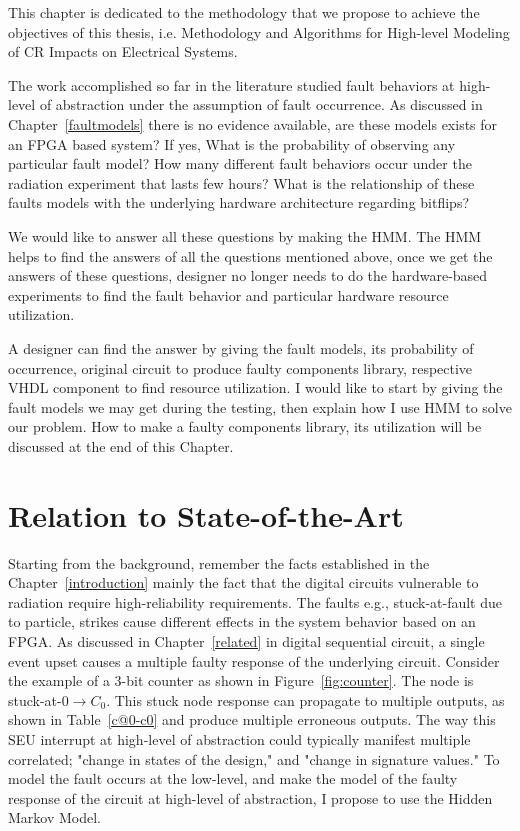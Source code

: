 This chapter is dedicated to the methodology that we propose to achieve the objectives of this thesis, i.e. Methodology and Algorithms for High-level Modeling of CR Impacts on Electrical Systems.




The work accomplished so far in the literature studied fault behaviors at high-level of abstraction under the assumption of fault occurrence. As discussed in Chapter~\ref{faultmodels} there is no evidence available, are these models exists for an FPGA based system? If yes, What is the probability of observing any particular fault model? How many different fault behaviors occur under the radiation experiment that lasts few hours?  What is the relationship of these faults models with the underlying hardware architecture regarding bitflips?

We would like to answer all these questions by making the HMM. The HMM helps to find the answers of all the questions mentioned above, once we get the answers of these questions, designer no longer needs to do the hardware-based experiments to find the fault behavior and particular hardware resource utilization. 

A designer can find the answer by giving the fault models, its probability of occurrence, original circuit to produce faulty components library, respective VHDL component to find resource utilization. I would like to start by giving the fault models we may get during the testing, then explain how I use HMM to solve our problem. How to make a faulty components library, its utilization will be discussed at the end of this Chapter.
\label{approach}
\section{Relation to State-of-the-Art}
Starting from the background, remember the facts established in the Chapter~\ref{introduction} mainly the fact that the digital circuits vulnerable to radiation require high-reliability requirements. The faults e.g., stuck-at-fault due to particle, strikes cause different effects in the system behavior based on an FPGA. As discussed in Chapter~\ref{related} in digital sequential circuit, a single event upset causes a multiple faulty response of the underlying circuit. Consider the example of  a 3-bit counter as shown in Figure~\ref{fig:counter}. The node is stuck-at-0$\rightarrow C_0$. This stuck node response can propagate to multiple outputs, as shown in Table~\ref{c@0-c0} and produce multiple erroneous outputs. The way this SEU interrupt at high-level of abstraction could typically manifest multiple correlated; "change in states of the design," and "change in signature values." To model the fault occurs at the low-level, and make the model of the faulty response of the circuit at high-level of abstraction, I propose to use the Hidden Markov Model. 




